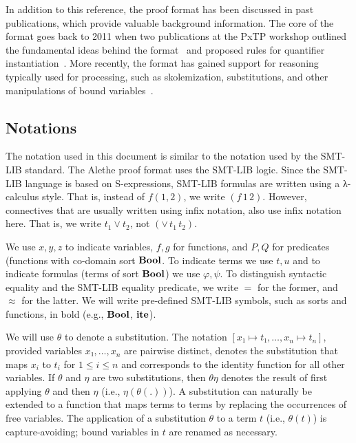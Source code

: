 \documentclass{scrartcl}
\begin{document}
In addition to this reference, the proof format has been discussed in past
publications, which provide valuable background information.  The core of
the format goes back to 2011 when two publications at the PxTP workshop
outlined the fundamental ideas behind the format~\cite{besson-2011}
and proposed rules for quantifier instantiation~\cite{deharbe-2011}.
%
More recently, the format has gained support for reasoning typically used for
processing, such as skolemization, substitutions, and other manipulations of
bound variables~\cite{barbosa-2019}.

\subsection{Notations}

The notation used in this document is similar to the notation
used by the SMT-LIB standard.  The Alethe proof format uses
the SMT-LIB logic.  Since the SMT-LIB language is based on
S-expressions, SMT-LIB formulas are written using
a λ-calculus style.  That is, instead of $f(1,2)$, we write $(f\,1\,2)$.
However, connectives that are usually written using infix notation, also
use infix notation here.  That is, we write $t_1 \lor t_2$, not
$(\lor\,t_1\,t_2)$.

We use $x, y, z$ to indicate variables,
$f, g$ for functions, and $P, Q$ for predicates (functions with co-domain
sort $\mathbf{Bool}$.  To indicate terms we use $t, u$ and to indicate
formulas (terms of sort $\mathbf{Bool}$) we use $\varphi, \psi$.
To distinguish syntactic equality and the SMT-LIB equality predicate,
we write $=$ for the former, and $≈$ for the latter.
We will write pre-defined SMT-LIB symbols, such as sorts and functions,
in bold (e.g., $\mathbf{Bool}$, $\mathbf{ite}$).

We will use $θ$ to denote a substitution.
The notation $[x₁ ↦ t₁, …, x_n ↦ t_n]$, provided variables
$x₁, …, x_n$ are pairwise distinct, denotes the substitution
that maps $x_i$ to $t_i$ for $1 ≤ i ≤ n$ and corresponds to the
identity function for all other variables.
%
If $θ$ and $η$ are two
substitutions, then $θη$ denotes the result of first applying $θ$
and then $η$ (i.e., $η(θ(.))$).  A substitution can naturally be extended
to a function that maps terms to terms by replacing the occurrences of
free variables. The application of a substitution $θ$ to a term $t$ (i.e., $θ(t)$)
is capture-avoiding; bound variables in $t$ are renamed as necessary.
\end{document}
